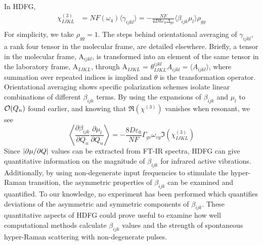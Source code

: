 \documentclass[aip, jcp, reprint, onecolumn]{revtex4-2}
\begin{document}
In HDFG, 
\begin{equation}\label{chi3}
\begin{split}
		\chi^{(3)}_{IJKL} &= NF(\omega_4) \langle \gamma_{ijkl} \rangle = -\frac{NF}{4D \hbar \varepsilon_0 \Delta_{gv}} \langle \beta_{ijk} \mu_l \rangle \rho_{gg}\\
\end{split}
\end{equation}
For simplicity, we take $\rho_{gg} = 1$.
The steps behind orientational averaging of $\gamma_{ijkl}$, a rank four tensor in the molecular frame, are detailed elsewhere.\cite{Andrews1977, McDonnell2024}
Briefly, a tensor in the molecular frame, A$_{ijkl}$, is transformed into an element of the same tensor in the laboratory frame, A$_{IJKL}$, through A$_{IJKL}$ = $\theta^{ijkl}_{IJKL} A_{ijkl} = \langle A_{ijkl} \rangle$, where summation over repeated indices is implied and $\theta$ is the transformation operator. \cite{McDonnell2024}
Orientational averaging shows specific polarization schemes isolate linear combinations of different $\beta_{ijk}$ terms. \cite{Bersohn1966, Willetts1992, Kauranen1996}
By using the expansions of $\beta_{ijk}$ and $\mu_{l}$ to $\order{Q_n}$ found earlier, and knowing that $\Re(\chi^{(3)})$ vanishes when resonant, we see
\begin{equation}\label{betasive}
	\left\langle \frac{\partial \beta_{ijk}}{\partial Q_n} {\frac{\partial \mu_l}{\partial Q_n}} \right\rangle = -\frac{8D \varepsilon_0}{NF}  {\Gamma_{gv} \omega_{vg}} {\Im(\chi^{(3)}_{IJKL})}
\end{equation}
Since $\abs{\partial \mu / \partial Q}$ values can be extracted from FT-IR spectra, HDFG can give quantitative information on the magnitude of $\beta_{ijk}$ for infrared active vibrations.
Additionally, by using non-degenerate input frequencies to stimulate the hyper-Raman transition, the asymmetric properties of $\beta_{ijk}$ can be examined and quantified. \cite{Christie1971, Denisov1986, Kozich2007}
To our knowledge, no experiment has been performed which quantifies deviations of the asymmetric and symmetric components of $\beta_{ijk}$. 
These quantitative aspects of HDFG could prove useful to examine how well computational methods calculate $\beta_{ijk}$ values and the strength of spontaneous hyper-Raman scattering with non-degenerate pulses.
\end{document}

